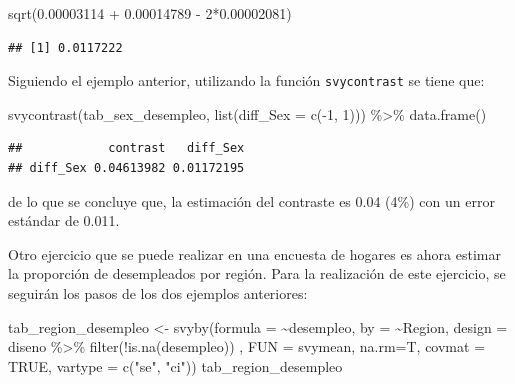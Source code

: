 \documentclass[
  12pt,
]{book}
\newenvironment{Shaded}{\begin{snugshade}}{\end{snugshade}}
\newcommand{\AttributeTok}[1]{\textcolor[rgb]{0.77,0.63,0.00}{#1}}
\newcommand{\ConstantTok}[1]{\textcolor[rgb]{0.00,0.00,0.00}{#1}}
\newcommand{\DecValTok}[1]{\textcolor[rgb]{0.00,0.00,0.81}{#1}}
\newcommand{\FloatTok}[1]{\textcolor[rgb]{0.00,0.00,0.81}{#1}}
\newcommand{\FunctionTok}[1]{\textcolor[rgb]{0.00,0.00,0.00}{#1}}
\newcommand{\NormalTok}[1]{#1}
\newcommand{\OtherTok}[1]{\textcolor[rgb]{0.56,0.35,0.01}{#1}}
\newcommand{\SpecialCharTok}[1]{\textcolor[rgb]{0.00,0.00,0.00}{#1}}
\newcommand{\StringTok}[1]{\textcolor[rgb]{0.31,0.60,0.02}{#1}}
\begin{document}
\begin{Shaded}
\begin{Highlighting}[]
\FunctionTok{sqrt}\NormalTok{(}\FloatTok{0.00003114}  \SpecialCharTok{+} \FloatTok{0.00014789} \SpecialCharTok{{-}} \DecValTok{2}\SpecialCharTok{*}\FloatTok{0.00002081}\NormalTok{)}
\end{Highlighting}
\end{Shaded}

\begin{verbatim}
## [1] 0.0117222
\end{verbatim}

Siguiendo el ejemplo anterior, utilizando la función \texttt{svycontrast} se tiene que:

\begin{Shaded}
\begin{Highlighting}[]
\FunctionTok{svycontrast}\NormalTok{(tab\_sex\_desempleo,}
            \FunctionTok{list}\NormalTok{(}\AttributeTok{diff\_Sex =} \FunctionTok{c}\NormalTok{(}\SpecialCharTok{{-}}\DecValTok{1}\NormalTok{, }\DecValTok{1}\NormalTok{))) }\SpecialCharTok{\%\textgreater{}\%}
  \FunctionTok{data.frame}\NormalTok{()}
\end{Highlighting}
\end{Shaded}

\begin{verbatim}
##            contrast   diff_Sex
## diff_Sex 0.04613982 0.01172195
\end{verbatim}

de lo que se concluye que, la estimación del contraste es 0.04 (4\%) con un error estándar de 0.011.

Otro ejercicio que se puede realizar en una encuesta de hogares es ahora estimar la proporción de desempleados por región. Para la realización de este ejercicio, se seguirán los pasos de los dos ejemplos anteriores:

\begin{Shaded}
\begin{Highlighting}[]
\NormalTok{tab\_region\_desempleo }\OtherTok{\textless{}{-}} \FunctionTok{svyby}\NormalTok{(}\AttributeTok{formula =}  \SpecialCharTok{\textasciitilde{}}\NormalTok{desempleo, }\AttributeTok{by =} \SpecialCharTok{\textasciitilde{}}\NormalTok{Region, }
                              \AttributeTok{design  =}\NormalTok{ diseno }\SpecialCharTok{\%\textgreater{}\%} \FunctionTok{filter}\NormalTok{(}\SpecialCharTok{!}\FunctionTok{is.na}\NormalTok{(desempleo)) , }
                              \AttributeTok{FUN     =}\NormalTok{ svymean, }\AttributeTok{na.rm=}\NormalTok{T, }\AttributeTok{covmat =} \ConstantTok{TRUE}\NormalTok{,}
                              \AttributeTok{vartype =} \FunctionTok{c}\NormalTok{(}\StringTok{"se"}\NormalTok{, }\StringTok{"ci"}\NormalTok{))}
\NormalTok{tab\_region\_desempleo}
\end{Highlighting}
\end{Shaded}
\end{document}
